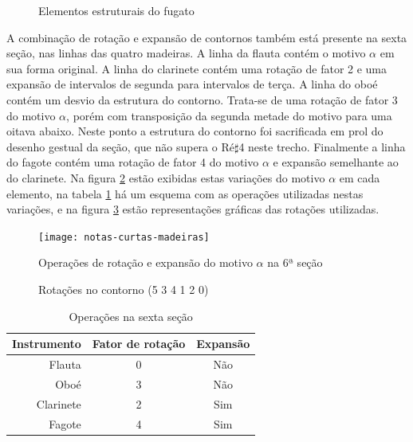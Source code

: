 \begin{figure}
  \centering

  \caption{Elementos estruturais do fugato}
  \label{fig:elementos-fugato}
\end{figure}

A combinação de rotação e expansão de contornos também está presente
na sexta seção, nas linhas das quatro madeiras. A linha da flauta
contém o motivo $\alpha$ em sua forma original. A linha do clarinete
contém uma rotação de fator 2 e uma expansão de intervalos de segunda
para intervalos de terça. A linha do oboé contém um desvio da
estrutura do contorno. Trata-se de uma rotação de fator 3 do motivo
$\alpha$, porém com transposição da segunda metade do motivo para uma
oitava abaixo. Neste ponto a estrutura do contorno foi sacrificada em
prol do desenho gestual da seção, que não supera o Ré$\sharp$4 neste
trecho. Finalmente a linha do fagote contém uma rotação de fator 4 do
motivo $\alpha$ e expansão semelhante ao do clarinete. Na figura
\ref{fig:notas-curtas-madeiras} estão exibidas estas variações do
motivo $\alpha$ em cada elemento, na tabela
\ref{tab:operacoes-secao-6} há um esquema com as operações utilizadas
nestas variações, e na figura \ref{fig:rotacoes-534120} estão
representações gráficas das rotações utilizadas.

\begin{figure}
  \centering
    \texttt{[image: notas-curtas-madeiras]}
    \caption{Operações de rotação e expansão do motivo $\alpha$ na 6ª
    seção}
  \label{fig:notas-curtas-madeiras}
\end{figure}

\begin{figure}
  \centering
  \subfloat[Rotação 2: (4 1 2 0 5 3)]{
    \texttt{[image: c-412053]}
    \label{fig:412053}  
  }
  \subfloat[Rotação 3: (1 2 0 5 3 4)]{
    \texttt{[image: c-120534]}
    \label{fig:120534}  
  }
  \subfloat[Rotação 4: (2 0 5 3 4 1)]{
    \texttt{[image: c-205341]}
    \label{fig:205341}  
  }
  \caption{Rotações no contorno (5 3 4 1 2 0)}
  \label{fig:rotacoes-534120}
\end{figure}

\begin{table}
  \centering
  \begin{tabular}{r|cc}
    Instrumento & Fator de rotação & Expansão \\
    \hline
    Flauta & 0 & Não \\
    Oboé & 3 & Não \\
    Clarinete & 2 & Sim \\
    Fagote & 4 & Sim \\
  \end{tabular}
  \caption{Operações na sexta seção}
  \label{tab:operacoes-secao-6}
\end{table}

